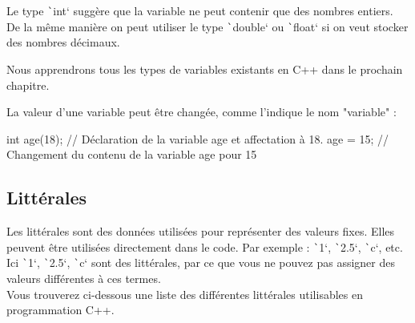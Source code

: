 \documentclass[10pt]{article}
\begin{document}
\begin{noteblock}
    Le type \texttt`int` suggère que la variable ne peut contenir que des nombres entiers. De la même manière on peut utiliser le type \texttt`double` ou \texttt`float`  si on veut stocker des nombres décimaux.
\end{noteblock}

Nous apprendrons tous les types de variables existants en C++ dans le prochain chapitre.

\bigskip
La valeur d'une variable peut être changée, comme l'indique le nom "variable" :

\begin{cppcode}
    int age(18); // Déclaration de la variable age et affectation à 18.
    age = 15; // Changement du contenu de la variable age pour 15
\end{cppcode}




\subsection{Littérales}
Les littérales sont des données utilisées pour représenter des valeurs fixes. Elles peuvent être utilisées directement dans le code. Par exemple : \texttt`1`, \texttt`2.5`, \texttt`c`, etc.\\
Ici \texttt`1`, \texttt`2.5`, \texttt`c` sont des littérales, par ce que vous ne pouvez pas assigner des valeurs différentes à ces termes.\\
Vous trouverez ci-dessous une liste des différentes littérales utilisables en programmation C++.
\end{document}
